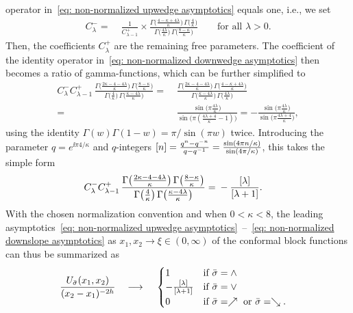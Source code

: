 \documentclass[oneside,english]{amsart}
\numberwithin{equation}{section}
\numberwithin{figure}{section}
\theoremstyle{plain}
\theoremstyle{plain}
\theoremstyle{plain}
\theoremstyle{remark}
\theoremstyle{plain}
\theoremstyle{plain}
\theoremstyle{plain}
\theoremstyle{plain}
\theoremstyle{plain}
\theoremstyle{plain}
\theoremstyle{plain}
\theoremstyle{plain}
\newcommand{\blue}[1]{{\color{blue} #1}}
\begin{document}
operator in~\eqref{eq: non-normalized upwedge asymptotics} %
equals one,
i.e., we set %
\begin{align*}
C_{\lambda}^{-} = \; & \frac{1}{C_{\lambda-1}^{+}}\times\frac{\Gamma\big(\frac{4-\kappa+4\lambda}{\kappa}\big)\,\Gamma\big(\frac{4}{\kappa}\big)}{\Gamma\big(\frac{4\lambda}{\kappa}\big)\,\Gamma\big(\frac{8-\kappa}{\kappa}\big)} \qquad
\text{for all $\lambda>0$.}
\end{align*}
Then, the coefficients $C_{\lambda}^{+}$ are the remaining free parameters.
The coefficient of the identity operator in~\eqref{eq: non-normalized downwedge asymptotics}
then becomes a ratio of gamma-functions, which can be further simplified to
\begin{align*}
C_{\lambda}^{-}C_{\lambda-1}^{+}\,\frac{\Gamma\big(\frac{2\kappa-4-4\lambda}{\kappa}\big)\,\Gamma\big(\frac{8-\kappa}{\kappa}\big)}{\Gamma\big(\frac{4}{\kappa}\big)\,\Gamma\big(\frac{\kappa-4\lambda}{\kappa}\big)}=\; & \frac{\Gamma\big(\frac{2\kappa-4-4\lambda}{\kappa}\big)\,\Gamma\big(\frac{4-\kappa+4\lambda}{\kappa}\big)}{\Gamma\big(\frac{\kappa-4\lambda}{\kappa}\big)\,\Gamma\big(\frac{4\lambda}{\kappa}\big)}\\
=\; & \frac{\sin\big(\pi\frac{4\lambda}{\kappa}\big)}{\sin\big(\pi(\frac{4\lambda+4}{\kappa}-1)\big)}=-\frac{\sin\big(\pi\frac{4\lambda}{\kappa}\big)}{\sin\big(\pi\frac{4\lambda+4}{\kappa}\big)} ,
\end{align*}
using the identity $\Gamma(w)\Gamma(1-w) = \pi / \sin(\pi w)$ twice.
Introducing the parameter $q=e^{\ii\pi4/\kappa}$ and $q$-integers
$\left[n\right]=\frac{q^{n}-q^{-n}}{q-q^{-1}}=\frac{\sin(4\pi n/\kappa)}{\sin(4\pi/\kappa)}$,
this takes the simple form
\begin{align*}
C_{\lambda}^{-}C_{\lambda-1}^{+}\,\frac{\Gamma\big(\frac{2\kappa-4-4\lambda}{\kappa}\big)\,\Gamma\big(\frac{8-\kappa}{\kappa}\big)}{\Gamma\big(\frac{4}{\kappa}\big)\,\Gamma\big(\frac{\kappa-4\lambda}{\kappa}\big)}=\; & -\frac{\left[\lambda\right]}{\left[\lambda+1\right]}.
\end{align*}
With the chosen normalization convention and when $0<\kappa<8$, the
leading asymptotics~\eqref{eq: non-normalized upwedge asymptotics}~--~\eqref{eq: non-normalized downslope asymptotics}
as $x_{1},x_{2}\to\xi\in(0,\infty)$ of the conformal block functions
can thus be summarized as
\begin{align*} %
\frac{U_{\sigmaseq}(x_{1},x_{2})}{(x_{2}-x_{1})^{-2h}}\quad \longrightarrow \quad\; & \begin{cases}
1 & \text{if }\sigmaseq=\upwedge\\
-\frac{\qnum{\lambda}}{\qnum{\lambda+1}} & \text{if }\sigmaseq=\downwedge\\
0 & \text{if }\sigmaseq=\upslope\text{ or }\sigmaseq=\downslope.
\end{cases}
\end{align*}
\end{document}
